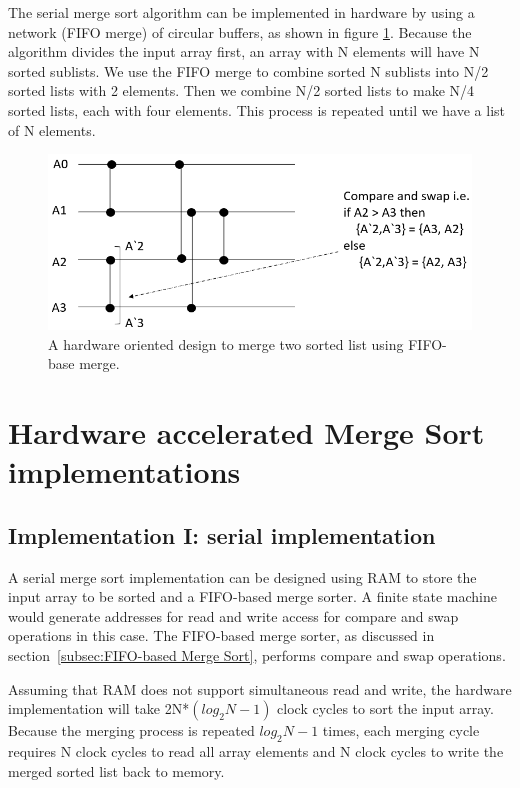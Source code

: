 \documentclass{article}
\begin{document}
The serial merge sort algorithm can be implemented in hardware by using a network (FIFO merge) of circular buffers, as shown in figure \ref{fig:fifo_nwk}. Because the algorithm divides the input array first, an array with N elements will have N sorted sublists. We use the FIFO merge to combine sorted N sublists into N/2 sorted lists with 2 elements. Then we combine N/2 sorted lists to make N/4 sorted lists, each with four elements. This process is repeated until we have a list of N elements.


\begin{figure}[H]
\centering
\includegraphics[width=1.00\textwidth]{fifo_nwk.PNG}
\caption{\label{fig:fifo_nwk}A hardware oriented design to merge two sorted list using FIFO-base merge.}
\end{figure}



\section{Hardware accelerated Merge Sort implementations}
\subsection{Implementation I: serial implementation}
\label{subsec:Implementation I}
A serial merge sort implementation can be designed using RAM to store the input array to be sorted and a FIFO-based merge sorter. A finite state machine would generate addresses for read and write access for compare and swap operations in this case. The FIFO-based merge sorter, as discussed in section~\ref{subsec:FIFO-based Merge Sort}, performs compare and swap operations.

Assuming that RAM does not support simultaneous read and write, the hardware implementation will take 2N*$(log_2N-1)$ clock cycles to sort the input array. Because the merging process is repeated $log_2N-1$ times, each merging cycle requires N clock cycles to read all array elements and N clock cycles to write the merged sorted list back to memory.
\end{document}
